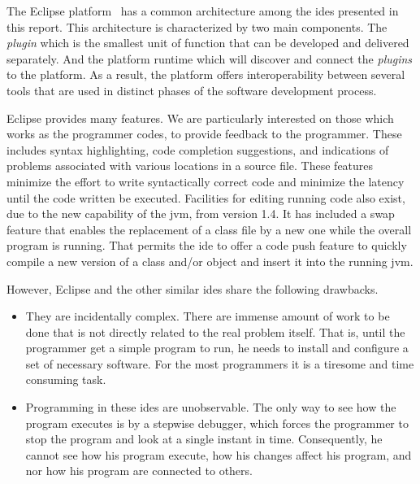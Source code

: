 The Eclipse platform~\cite{DesRivieres2004} has a common architecture among the \ac{ide}s presented in this report. This architecture is characterized by two main components. The \textit{plugin} which is the smallest unit of function that can be developed and delivered separately. And the platform runtime which will discover and connect the \textit{plugins} to the platform. As a result, the platform offers interoperability between several tools that are used in distinct phases of the software development process.

Eclipse provides many features. We are particularly interested on those which works as the programmer codes, to provide feedback to the programmer. These includes syntax highlighting, code completion suggestions, and indications of problems associated with various locations in a source file. These features minimize the effort to write syntactically correct code and minimize the latency until the code written be executed. Facilities for editing running code also exist, due to the new capability of the \ac{jvm}, from version 1.4. It has included a swap feature that enables the replacement of a class file by a new one while the overall program is running. That permits the \ac{ide} to offer a code push feature to quickly compile a new version of a class and/or object and insert it into the running \ac{jvm}.

However, Eclipse and the other similar \ac{ide}s share the following drawbacks.
\begin{itemize}
	\item They are incidentally complex. There are immense amount of work to be done that is not directly related to the real problem itself. That is, until the programmer get a simple program to run, he needs to install and configure a set of necessary software. For the most programmers it is a tiresome and time consuming task.
	\item Programming in these \ac{ide}s are unobservable. The only way to see how the program executes is by a stepwise debugger, which forces the programmer to stop the program and look at a single instant in time. Consequently, he cannot see how his program execute, how his changes affect his program, and nor how his program are connected to others.
\end{itemize}
